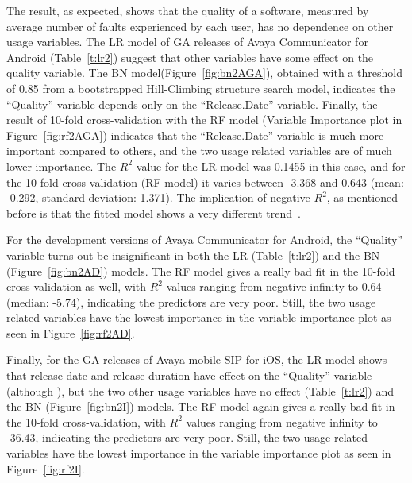 \documentclass[smallextended]{svjour3}       %
\begin{document}
The result, as expected, shows that the quality of a software, measured by average number of faults experienced by each user, has no dependence on other usage variables. 
The LR model of GA releases of Avaya Communicator for Android (Table~\ref{t:lr2}) suggest that other variables have some effect on the quality variable.
The BN model(Figure~\ref{fig:bn2AGA}), obtained with a threshold of 0.85 from a bootstrapped Hill-Climbing structure search model, indicates the ``Quality'' variable depends only on  the ``Release.Date'' variable.
Finally, the result of 10-fold cross-validation with the RF model (Variable Importance plot in Figure~\ref{fig:rf2AGA}) indicates that the ``Release.Date'' variable is much more important compared to others, and the two usage related variables are of much lower importance. The $R^2$ value for the LR model was 0.1455 in this case, and for the 10-fold cross-validation (RF model) it varies between -3.368 and 0.643 (mean: -0.292, standard deviation: 1.371). The implication of negative $R^2$, as mentioned before is that the fitted model shows a very different trend~\cite{negRsq}.

For the development versions of Avaya Communicator for Android, the ``Quality'' variable turns out be insignificant in both the LR (Table~\ref{t:lr2}) and the BN (Figure~\ref{fig:bn2AD}) models. The RF model gives a really bad fit in the 10-fold cross-validation as well, with $R^2$ values ranging from negative infinity to 0.64 (median: -5.74), indicating the predictors are very poor. Still, the two usage related variables have the lowest importance in the variable importance plot as seen in Figure~\ref{fig:rf2AD}.

Finally, for the GA releases of Avaya mobile SIP for iOS, the LR model shows that release date and release duration have effect on the ``Quality'' variable (although ), but the two other usage variables have no effect (Table~\ref{t:lr2}) and the BN (Figure~\ref{fig:bn2I}) models. The RF model again gives a really bad fit in the 10-fold cross-validation, with $R^2$ values ranging from negative infinity to -36.43, indicating the predictors are very poor. Still, the two usage related variables have the lowest importance in the variable importance plot as seen in Figure~\ref{fig:rf2I}.
\end{document}
